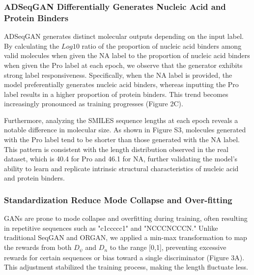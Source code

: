 \documentclass[10pt, twocolumn]{article}
\begin{document}
\subsubsection*{ADSeqGAN Differentially Generates Nucleic Acid and Protein Binders}

ADSeqGAN generates distinct molecular outputs depending on the input label. By calculating the $Log10$ ratio of the proportion of nucleic acid binders among valid molecules when given the NA label to the proportion of nucleic acid binders when given the Pro label at each epoch, we observe that the generator exhibits strong label responsiveness. Specifically, when the NA label is provided, the model preferentially generates nucleic acid binders, whereas inputting the Pro label results in a higher proportion of protein binders. This trend becomes increasingly pronounced as training progresses (Figure 2C).

Furthermore, analyzing the SMILES sequence lengths at each epoch reveals a notable difference in molecular size. As shown in Figure S3, molecules generated with the Pro label tend to be shorter than those generated with the NA label. This pattern is consistent with the length distribution observed in the real dataset, which is 40.4 for Pro and 46.1 for NA, further validating the model's ability to learn and replicate intrinsic structural characteristics of nucleic acid and protein binders.


\subsubsection*{Standardization Reduce Mode Collapse and Over-fitting}


GANs are prone to mode collapse and overfitting during training, often resulting in repetitive sequences such as "c1ccccc1" and "NCCCNCCCN." Unlike traditional SeqGAN and ORGAN, we applied a min-max transformation to map the rewards from both $D_{\psi}$ and $D_n$ to the range [0,1], preventing excessive rewards for certain sequences or bias toward a single discriminator (Figure 3A). This adjustment stabilized the training process, making the length fluctuate less.
\end{document}
